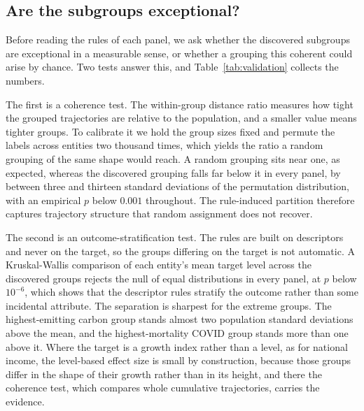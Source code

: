 \subsection{Are the subgroups exceptional?}
\label{sec:validation}

Before reading the rules of each panel, we ask whether the discovered subgroups are exceptional in a measurable sense, or whether a grouping this coherent could arise by chance. Two tests answer this, and Table~\ref{tab:validation} collects the numbers.

The first is a coherence test. The within-group distance ratio measures how tight the grouped trajectories are relative to the population, and a smaller value means tighter groups. To calibrate it we hold the group sizes fixed and permute the labels across entities two thousand times, which yields the ratio a random grouping of the same shape would reach. A random grouping sits near one, as expected, whereas the discovered grouping falls far below it in every panel, by between three and thirteen standard deviations of the permutation distribution, with an empirical $p$ below $0.001$ throughout. The rule-induced partition therefore captures trajectory structure that random assignment does not recover.

The second is an outcome-stratification test. The rules are built on descriptors and never on the target, so the groups differing on the target is not automatic. A Kruskal-Wallis comparison of each entity's mean target level across the discovered groups rejects the null of equal distributions in every panel, at $p$ below $10^{-6}$, which shows that the descriptor rules stratify the outcome rather than some incidental attribute. The separation is sharpest for the extreme groups. The highest-emitting carbon group stands almost two population standard deviations above the mean, and the highest-mortality COVID group stands more than one above it. Where the target is a growth index rather than a level, as for national income, the level-based effect size is small by construction, because those groups differ in the shape of their growth rather than in its height, and there the coherence test, which compares whole cumulative trajectories, carries the evidence.

